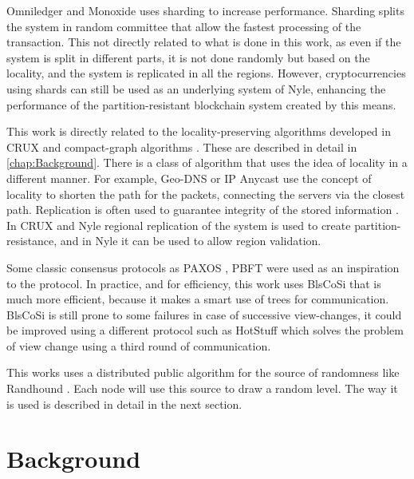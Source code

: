 \documentclass[a4paper,11pt,oneside]{report}
\begin{document}
Omniledger \cite{Kokoris-Kogias2017}  and Monoxide \cite{Wang2019} uses
sharding to increase performance.  Sharding splits the system in random
committee that allow the fastest processing of the transaction. This not
directly related to what is done in this work, as even if the system is split
in different parts, it is not done randomly but based on the locality, and the
system is replicated in all the regions. However, cryptocurrencies using shards
can still be used as an underlying system of Nyle, enhancing the performance of
the partition-resistant blockchain system created by this means.

This work is directly related to the locality-preserving algorithms developed
in CRUX \cite{Basescu2014} and compact-graph algorithms \cite{Thorup2005}.
These are described in detail in \autoref{chap:Background}. There is a class of
algorithm that uses the idea of locality in a different manner. For example,
Geo-DNS \cite{Katz-bassett2006} or IP Anycast \cite{Abley2006} use the concept of locality to shorten the path for the packets, connecting the servers via the
closest path. Replication is often used to guarantee integrity of the stored
information \cite{Mokadem2015}. In CRUX \cite{Basescu2014} and Nyle
regional replication of the system is used to create partition-resistance, and
in Nyle it can be used to allow region validation.

Some classic consensus protocols as PAXOS \cite{Lamport2000}, PBFT
\cite{Castro1999} were used as an inspiration to the
protocol. In practice, and for efficiency, this work uses BlsCoSi
\cite{Boneh2018} that is much more efficient, because it makes a smart use of trees for communication.
BlsCoSi \cite{Boneh2018} is still prone to some failures in case of successive
view-changes, it could be improved using a different protocol such as HotStuff
\cite{Yin2018} which solves the problem of view change using a third round of
communication. 

This works uses a distributed public algorithm for the source of randomness
like Randhound \cite{Syta2016}. Each node will use this source to draw a random
level.  The way it is used is described in detail in the next section. 


\chapter{Background} \label{chap:Background}  %
\end{document}
